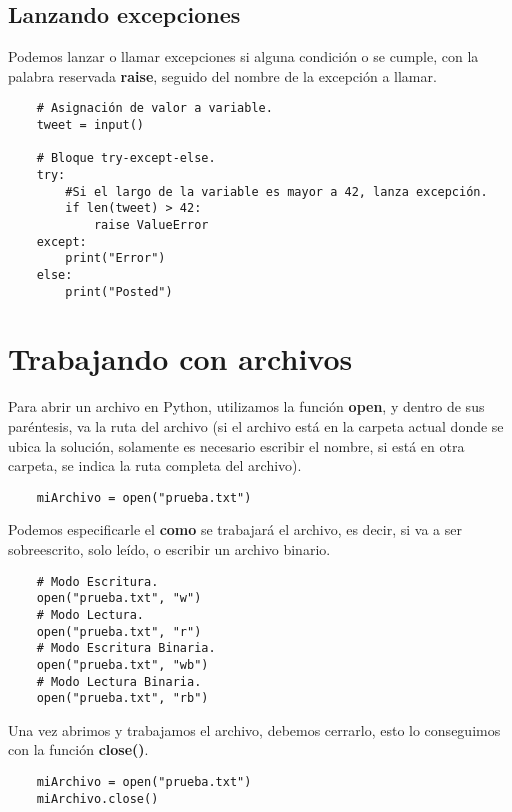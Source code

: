 \subsection{Lanzando excepciones}

Podemos lanzar o llamar excepciones si alguna condición o se cumple, con la palabra reservada \textbf{raise}, seguido del nombre de la excepción a llamar.
\begin{lstlisting}
    # Asignación de valor a variable.   
    tweet = input()

    # Bloque try-except-else.
    try:
        #Si el largo de la variable es mayor a 42, lanza excepción.
        if len(tweet) > 42:
            raise ValueError
    except:
        print("Error")
    else:
        print("Posted")
\end{lstlisting}



\section{Trabajando con archivos}

Para abrir un archivo en Python, utilizamos la función \textbf{open}, y dentro de sus paréntesis, va la ruta del archivo (si el archivo está en la carpeta actual donde se ubica la solución, solamente es necesario escribir el nombre, si está en otra carpeta, se indica la ruta completa del archivo).
\begin{lstlisting}
    miArchivo = open("prueba.txt")
\end{lstlisting}

Podemos especificarle el \textbf{como} se trabajará el archivo, es decir, si va a ser sobreescrito, solo leído, o escribir un archivo binario.
\begin{lstlisting}
    # Modo Escritura.
    open("prueba.txt", "w")
    # Modo Lectura.
    open("prueba.txt", "r")
    # Modo Escritura Binaria.
    open("prueba.txt", "wb")
    # Modo Lectura Binaria.
    open("prueba.txt", "rb")
\end{lstlisting}

Una vez abrimos y trabajamos el archivo, debemos cerrarlo, esto lo conseguimos con la función \textbf{close()}.
\begin{lstlisting}
    miArchivo = open("prueba.txt")
    miArchivo.close()
\end{lstlisting}

